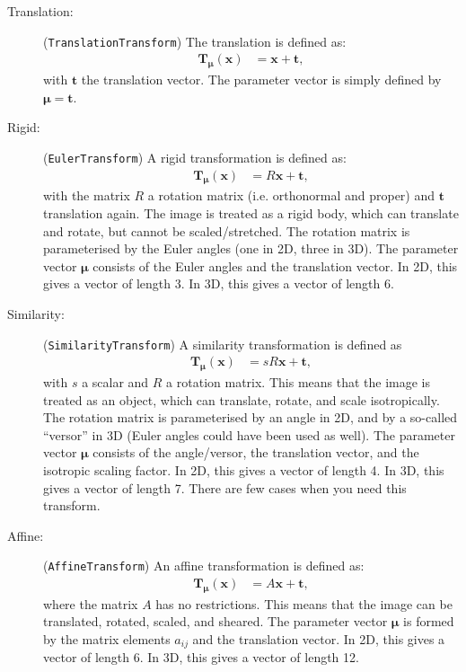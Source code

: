 \documentclass[]{report}
\newcommand{\vx}{\bm{x}}
\newcommand{\vmu}{\bm{\mu}}
\newcommand{\vTmx}{\bm{T}_{\vmu}(\bm{x})}
\begin{document}
\begin{description}
\item[Translation:] (\texttt{TranslationTransform}) The translation is defined as:
\begin{align}
\vTmx &= \vx + \bm{t},
\end{align}
with $\bm{t}$ the translation vector. The parameter vector is
simply defined by $\vmu=\bm{t}$.

\item[Rigid:] (\texttt{EulerTransform}) A rigid transformation is defined as:
\begin{align}
\vTmx &= R \vx + \bm{t},
\end{align}
with the matrix $R$ a rotation matrix (i.e. orthonormal and proper)
and $\bm{t}$ translation again. The image is treated as a rigid body,
which can translate and rotate, but cannot be scaled/stretched. The
rotation matrix is parameterised by the Euler angles (one in 2D,
three in 3D). The parameter vector $\vmu$ consists of the Euler
angles and the translation vector. In 2D, this gives a vector of
length 3. In 3D, this gives a vector of length 6.

\item[Similarity:] (\texttt{SimilarityTransform}) A similarity transformation is defined as
\begin{align}
\vTmx &= s R \vx + \bm{t},
\end{align}
with $s$ a scalar and $R$ a rotation matrix. This means that the
image is treated as an object, which can translate, rotate, and
scale isotropically. The rotation matrix is parameterised by an
angle in 2D, and by a so-called ``versor'' in 3D (Euler angles
could have been used as well). The parameter vector $\vmu$
consists of the angle/versor, the translation vector, and the
isotropic scaling factor. In 2D, this gives a vector of length 4.
In 3D, this gives a vector of length 7. There are few cases when
you need this transform.

\item[Affine:] (\texttt{AffineTransform}) An affine transformation is defined as:
\begin{align}
\vTmx &= A \vx + \bm{t},
\end{align}
where the matrix $A$ has no restrictions. This means that the
image can be translated, rotated, scaled, and sheared. The
parameter vector $\vmu$ is formed by the matrix elements $a_{ij}$
and the translation vector. In 2D, this gives a vector of length
6. In 3D, this gives a vector of length 12.


\end{description}
\end{document}
